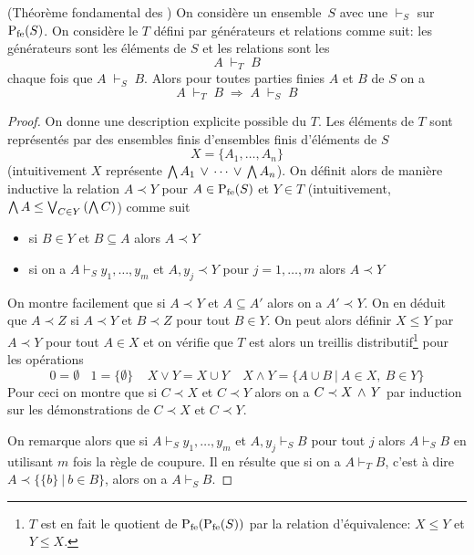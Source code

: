 \begin{theorem}
\label{thEntRel1} {\rm  (Théorème fondamental des \entrels)} On
considère un ensemble~$S$  avec une \entrel
$\vdash_S$ sur ${{\rm P}_{{\rm fe}}}(S)$. On considère le \trdi $T$ défini par
générateurs et relations comme suit: les générateurs sont les
éléments de $S$ et les relations sont les
$$ A\; \vdash_T \;  B
$$
chaque fois que $A\; \vdash_S \; B$.  Alors pour toutes parties finies $A$
et $B$ de $S$  on a
$$  A\; \vdash_T \;  B
\; \Longrightarrow \; A\; \vdash_S \;  B
$$
\end{theorem}
\begin{proof}
On donne une description explicite possible du \trdi $T$. Les
éléments de $T$ sont représentés par
des ensembles finis d'ensembles finis d'éléments de $S$
$$X=\{A_1,\dots,A_n\}$$
(intuitivement $X$ représente $\bigwedge A_1\,\vee\,\cdots\,\vee\,\bigwedge A_n$).
On définit alors de manière inductive la relation
 $A\prec Y$ pour $A\in {{\rm P}_{{\rm fe}}}(S)$ et $Y\in T$
(intuitivement, $\bigwedge A\leq \bigvee_{C\in Y} \left(\bigwedge C\right) $) comme suit
\begin{itemize}
\item si $B\in Y$ et $B\subseteq A$ alors $A\prec Y$
\item si on a $A\vdash_S y_1,\dots,y_m$ et $A,y_j\prec Y$ pour
$j=1,\ldots,m$ alors $A\prec Y$
\end{itemize}
On montre facilement que si $A\prec Y$ et $A\subseteq A'$ alors on
a $A'\prec Y.$ On en déduit que $A\prec Z$ si $A\prec Y$ et $B\prec Z$
pour tout $B\in Y$. On peut alors définir $X\leq Y$ par
$A\prec Y$ pour tout $A\in X$ et on vérifie que $T$ est alors
un treillis distributif\footnote{$T$ est en fait le quotient de
${{\rm P}_{{\rm fe}}}({{\rm P}_{{\rm fe}}}(S))$ par la relation d'équivalence: $X\leq Y$ et $Y\leq X$.}
pour les opérations
$$0 = \emptyset~~~~1 = \{\emptyset\}~~~~~X\vee Y = X\cup Y~~~~~
X\wedge
Y = \{ A \cup B~|~A\in X,~B\in Y\}
$$
Pour ceci on montre que si $C\prec X$ et $C\prec Y$ alors on a
$C\prec X\,\wedge\, Y$ par induction sur les démonstrations de $C\prec X$ et
$C\prec Y$.

On remarque alors que si $A\vdash_S y_1,\dots,y_m$ et $A,y_j\vdash_S B$
pour tout $j$ alors $A\vdash_S B$ en utilisant $m$ fois la règle de
coupure. Il en résulte que si on a $A\vdash_T B$,
c'est à dire $A\prec \{\{b\}~|~b\in B\}$, alors on a $A\vdash_S B$.
\end{proof}



